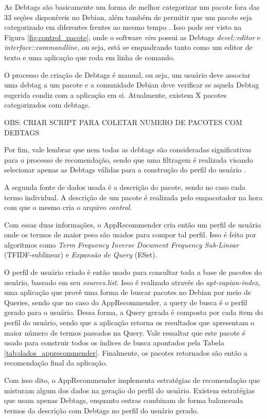 As Debtags são basicamente um forma de melhor categorizar um pacote fora das 33
seções disponíveis no Debian, além também de permitir que um pacote seja
categorizado em diferentes frentes ao mesmo tempo \cite{zini2005cute}. Isso pode ser visto na Figura
\ref{fig:control_pacote}, onde o software \textit{vim} possui as Debtags
\textit{devel::editor} e \textit{interface::commandline}, ou seja, está se
enquadrando tanto como um editor de texto e uma aplicação que roda em linha de
comando.

O processo de criação de Debtags é manual, ou seja, um usuário deve associar uma
debtag a um pacote e a comunidade Debian deve verificar se aquela Debtag
sugerida condiz com a aplicação em si. Atualmente, existem X pacotes
categorizados com debtags.

OBS: CRIAR SCRIPT PARA COLETAR NUMERO DE PACOTES COM DEBTAGS

Por fim, vale lembrar que nem todas as debtags são consideradas significativas
para o processo de recomendação, sendo que uma filtragem é realizada visando
selecionar apenas as Debtags válidas para a construção do perfil do usuário
\cite{araujo2011apprecommender}.

A segunda fonte de dados usada é a descrição do pacote, sendo no caso cada termo
individual. A descrição de um pacote é realizada pelo empacotador na hora com
que o mesmo cria o arquivo \textit{control}.

Com essas duas informações, o AppRecommender cria então um perfil de usuário
onde os termos de maior peso são usados para compor tal perfil. Isso é feito por
algoritmos como \textit{Term Frequency Inverse Document Frequency Sub-Linear}
(TFIDF-sublinear) e \textit{Expansão de Query} (ESet).

O perfil de usuário criado é então usado para consultar toda a base de pacotes
do usuário, baseado em seu \textit{sources.list}.
Isso é realizado através do \textit{apt-xapian-index}, uma aplicação
que provê uma forma de buscar pacotes no Debian por meio de Queries, sendo que no
caso do AppRecommender, a query de busca é o perfil gerado para o usuário. Dessa
forma, a Query gerada é composta por cada item do perfil do usuário, sendo que a
aplicação retorna os resultados que apresentam o maior número de termos passados
na Query.
Vale ressaltar que este pacote é usado para construir todos os índices de busca
apontados pela Tabela \ref{tab:dados_apprecommender}.
Finalmente, os pacotes retornados são então a recomendação final da aplicação.

Com isso dito, o AppRecommender implementa estratégias de recomendação que
misturam algum dos dados na geração do perfil do usuário. Existem estratégias
que usam apenas Debtags, enquanto outras combinam de forma balanceada termos da
descrição com Debtags no perfil do usuário gerado.


